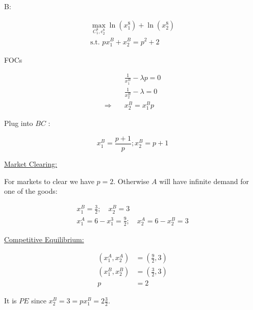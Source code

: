 {\begin{enumerate}[label=(\alph*)]
{B:

\begin{align*}
    \max _{C_{1}^{8}, c_{2}^{8}} \ln \left(x_{1}^{8}\right)+\ln \left(x_{2}^{8}\right) \\
    \text{s.t. } p x_{1}^{B}+x_{2}^{B}=p^{2}+2
\end{align*}

FOCs

\begin{align*}
    &\frac{1}{x_{1}^{B}}-\lambda p=0 \\
    &\frac{1}{x_{2}^{B}}-\lambda=0 \\
    \Longrightarrow \quad & x_{2}^{B}=x_{1}^{B} p
\end{align*}

Plug into $B C$ :

$$
x_{1}^{B}=\frac{p+1}{p} ; x_{2}^{B}=p+1
$$

\underline{Market Clearing: } 

For markets to clear we have $p=2$. Otherwise $A$ will have infinite demand for one of the goods:

$$
\begin{gathered}
x_{1}^{B}=\frac{3}{2} ;\quad x_{2}^{B}=3 \\
x_{1}^{A}=6-x_{1}^{3}=\frac{9}{2} ;\quad x_{2}^{A}=6-x_{2}^{B}=3
\end{gathered}
$$

\underline{Competitive Equilibrium: }

\begin{align*}
    \left(x_{1}^{A}, x_{2}^{A}\right) &= (\frac{9}{2},3) \\
    \left(x_{1}^{B}, x_{2}^{B}\right) &= (\frac{3}{2},3) \\
    p&=2
\end{align*}

It is $P E$ since $x_{2}^{B}=3=p x_{1}^{B}=2\frac{3}{2}$.
}
\end{enumerate}
}
